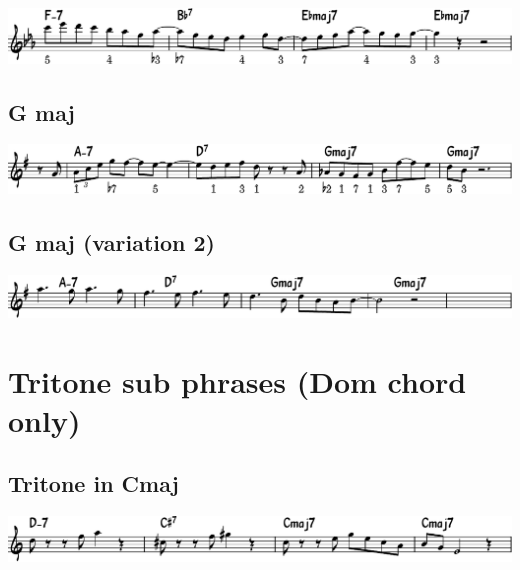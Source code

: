 \documentclass[11pt]{article}
\begin{document}
\begin{center}
\includegraphics[width=.9\linewidth]{e-flat.pdf}
\end{center}

\subsection*{G maj}
\label{sec:orgc1debc5}
\begin{center}
\includegraphics[width=.9\linewidth]{g_maj.pdf}
\end{center}

\subsection*{G maj (variation 2)}
\label{sec:orgeeba5e0}
\begin{center}
\includegraphics[width=.9\linewidth]{g_maj_v2.pdf}
\end{center}

\section*{Tritone sub phrases (Dom chord only)}
\label{sec:org27bf2bf}

\subsection*{Tritone in Cmaj}
\label{sec:orgd8a2ad9}
\begin{center}
\includegraphics[width=.9\linewidth]{tritone-c-maj.pdf}
\end{center}
\end{document}
